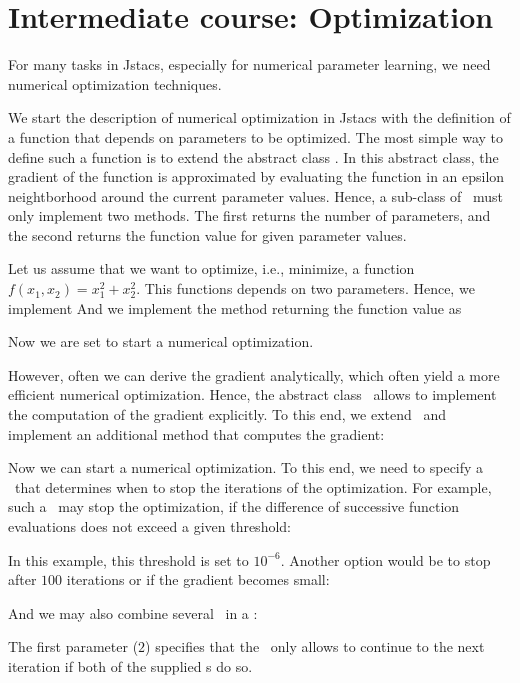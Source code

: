 \section{Intermediate course: Optimization}\label{Optimization}

For many tasks in Jstacs, especially for numerical parameter learning, we need numerical optimization techniques.

We start the description of numerical optimization in Jstacs with the definition of a function that depends on parameters to be optimized. The most simple way to define such a function is to extend the abstract class \NumericalDifferentiableFunction. In this abstract class, the gradient of the function is approximated by evaluating the function in an epsilon neightborhood around the current parameter values. Hence, a sub-class of \NumericalDifferentiableFunction~must only implement two methods. The first returns the number of parameters, and the second returns the function value for given parameter values.

Let us assume that we want to optimize, i.e., minimize, a function $f(x_1,x_2)=x_1^2 + x_2^2$. This functions depends on two parameters. Hence, we implement
\setcounter{off}{499}
And we implement the method returning the function value as
\addtocounter{off}{5}
Now we are set to start a numerical optimization.

However, often we can derive the gradient analytically, which often yield a more efficient numerical optimization. Hence, the abstract class \DifferentiableFunction~allows to implement the computation of the gradient explicitly. To this end, we extend \DifferentiableFunction~and implement an additional method that computes the gradient:
\addtocounter{off}{19}

Now we can start a numerical optimization. To this end, we need to specify a \TerminationCondition~that determines when to stop the iterations of the optimization. For example, such a \TerminationCondition~may stop the optimization, if the difference of successive function evaluations does not exceed a given threshold:
\addtocounter{off}{7}
In this example, this threshold is set to $10^{-6}$. Another option would be to stop after $100$ iterations or if the gradient becomes small:
\addtocounter{off}{1}

And we may also combine several \TerminationCondition~in a \CombinedCondition:
\addtocounter{off}{3}
The first parameter ($2$) specifies that the \CombinedCondition~only allows to continue to the next iteration if both of the supplied \TerminationCondition s do so. 

